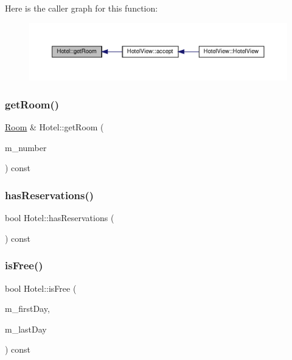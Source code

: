 Here is the caller graph for this function\+:\nopagebreak
\begin{figure}[H]
\begin{center}
\leavevmode
\includegraphics[width=350pt]{class_hotel_ac836a89654a7561169ca1523f0365861_icgraph}
\end{center}
\end{figure}
\mbox{\label{class_hotel_a5188fb61eb6bd1fa3e971f2457c50947}} 
\subsubsection{\texorpdfstring{get\+Room()}{getRoom()}\hspace{0.1cm}{\footnotesize\ttfamily [2/2]}}
{\footnotesize\ttfamily \hyperlink{class_room}{Room} \& Hotel\+::get\+Room (\begin{DoxyParamCaption}\item[{int}]{m\+\_\+number }\end{DoxyParamCaption}) const}

\mbox{\label{class_hotel_a05e576bdd914079ceb0781323408014b}} 
\subsubsection{\texorpdfstring{has\+Reservations()}{hasReservations()}}
{\footnotesize\ttfamily bool Hotel\+::has\+Reservations (\begin{DoxyParamCaption}{ }\end{DoxyParamCaption}) const\hspace{0.3cm}{\ttfamily [inline]}}

\mbox{\label{class_hotel_aa11ad566c8765362795e53f4088e10d7}} 
\subsubsection{\texorpdfstring{is\+Free()}{isFree()}}
{\footnotesize\ttfamily bool Hotel\+::is\+Free (\begin{DoxyParamCaption}\item[{Q\+Date}]{m\+\_\+first\+Day,  }\item[{Q\+Date}]{m\+\_\+last\+Day }\end{DoxyParamCaption}) const\hspace{0.3cm}{\ttfamily [inline]}}

